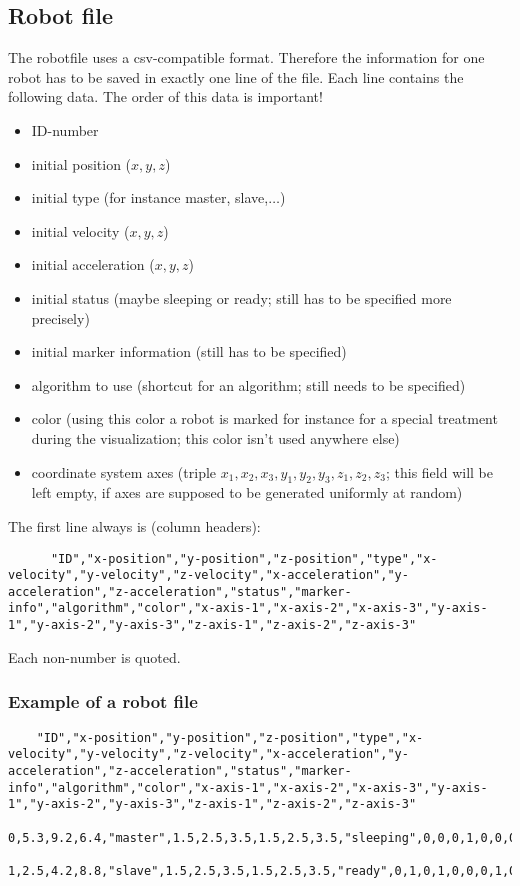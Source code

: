 \subsection{Robot file}
The robotfile uses a csv-compatible format.
Therefore the information for one robot has to be saved in exactly one line of the file.
Each line contains the following data. The order of this data is important!
\begin{itemize}
	\item ID-number
	\item initial position ($x,y,z$)
	\item initial type (for instance master, slave,$\ldots$)
	\item initial velocity ($x,y,z$)
	\item initial acceleration ($x,y,z$)
	\item initial status (maybe sleeping or ready; still has to be specified more precisely)
	\item initial marker information (still has to be specified)
	\item algorithm to use (shortcut for an algorithm; still needs to be specified)
	\item color (using this color a robot is marked for instance for a special treatment during the visualization; this color isn't used anywhere else)
	\item coordinate system axes (triple $x_1,x_2,x_3,y_1,y_2,y_3,z_1,z_2,z_3$; this field will be left empty, if axes are supposed to be generated uniformly at random)
\end{itemize}
The first line always is (column headers):
\begin{lstlisting}
	  "ID","x-position","y-position","z-position","type","x-velocity","y-velocity","z-velocity","x-acceleration","y-acceleration","z-acceleration","status","marker-info","algorithm","color","x-axis-1","x-axis-2","x-axis-3","y-axis-1","y-axis-2","y-axis-3","z-axis-1","z-axis-2","z-axis-3"
\end{lstlisting}
Each non-number is quoted.

\subsubsection{Example of a robot file}
\begin{lstlisting}
	"ID","x-position","y-position","z-position","type","x-velocity","y-velocity","z-velocity","x-acceleration","y-acceleration","z-acceleration","status","marker-info","algorithm","color","x-axis-1","x-axis-2","x-axis-3","y-axis-1","y-axis-2","y-axis-3","z-axis-1","z-axis-2","z-axis-3"
	0,5.3,9.2,6.4,"master",1.5,2.5,3.5,1.5,2.5,3.5,"sleeping",0,0,0,1,0,0,0,1,0,0,0,1
	1,2.5,4.2,8.8,"slave",1.5,2.5,3.5,1.5,2.5,3.5,"ready",0,1,0,1,0,0,0,1,0,0,0,1
\end{lstlisting}

